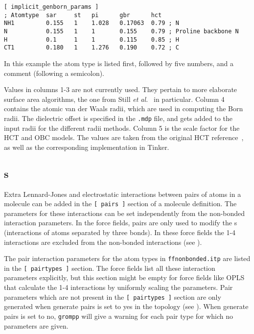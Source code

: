 {\small
\begin{verbatim}
[ implicit_genborn_params ]
; Atomtype  sar     st   pi      gbr      hct
NH1         0.155   1    1.028   0.17063  0.79 ; N
N           0.155   1    1       0.155    0.79 ; Proline backbone N
H           0.1     1    1       0.115    0.85 ; H
CT1         0.180   1    1.276   0.190    0.72 ; C
\end{verbatim}}

In this example the atom type is listed first, followed by five
numbers, and a comment (following a semicolon).

Values in columns 1-3 are not currently used. They pertain to more
elaborate surface area algorithms, the one from Still {\em et al.}~\cite{Still97} in
particular.  Column 4 contains the atomic van der Waals radii, which are used
in computing the Born radii. The dielectric offset is specified in
the {\tt *.mdp} file, and gets added to the input radii for the different
radii methods.  Column 5 is the scale factor for the HCT and OBC
models. The values are taken from the original HCT reference~\cite{Truhlar96}, as well
as the corresponding implementation in Tinker.


\subsection{s}
Extra Lennard-Jones and electrostatic interactions between pairs
of atoms in a molecule can be added in the {\tt [~pairs~]} section of
a molecule definition. The parameters for these interactions can
be set independently from the non-bonded interaction parameters.
In the {\gromos} force fields, pairs are only used
to modify the s (interactions of atoms
separated by three bonds). In these force fields the 1-4 interactions
are excluded from the non-bonded interactions (see ).

The pair interaction parameters for the atom types
in {\tt ffnonbonded.itp} are listed in the {\tt [~pairtypes~]} section.
The {\gromos} force fields list all these interaction parameters
explicitly, but this section might be empty for force fields like
OPLS that calculate the 1-4 interactions by uniformly scaling the parameters.
Pair parameters which are not present in the {\tt [~pairtypes~]} section
are only generated when generate pairs is set to yes in the topology
(see ). When generate pairs is set to no, {\tt grompp}
will give a warning for each pair type for which no parameters are given.

